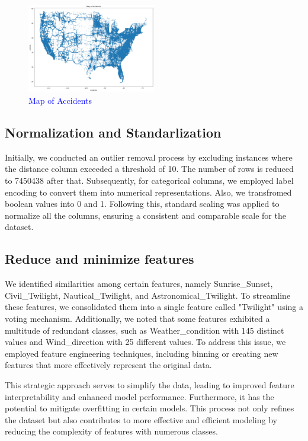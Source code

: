 \documentclass[10pt,twocolumn,letterpaper]{article}
\begin{document}
\begin{CJK}{UTF8}{bsmi}
\begin{figure}[h]
    \centering
    \includegraphics[width=0.5\textwidth]{graph3.png}
    \caption{\textcolor{blue}{Map of Accidents}}
    \label{Fig.3}
\end{figure}

\subsection{Normalization and Standarlization}
Initially, we conducted an outlier removal process by excluding instances where the distance column exceeded a threshold of 10. The number of rows is reduced to 7450438 after that. Subsequently, for categorical columns, we employed label encoding to convert them into numerical representations. Also, we transfromed boolean values into 0 and 1. Following this, standard scaling was applied to normalize all the columns, ensuring a consistent and comparable scale for the dataset.

\subsection{Reduce and minimize features}
We identified similarities among certain features, namely Sunrise\_Sunset, Civil\_Twilight, Nautical\_Twilight, and Astronomical\_Twilight. To streamline these features, we consolidated them into a single feature called "Twilight" using a voting mechanism. Additionally, we noted that some features exhibited a multitude of redundant classes, such as Weather\_condition with 145 distinct values and Wind\_direction with 25 different values. To address this issue, we employed feature engineering techniques, including binning or creating new features that more effectively represent the original data.

This strategic approach serves to simplify the data, leading to improved feature interpretability and enhanced model performance. Furthermore, it has the potential to mitigate overfitting in certain models. This process not only refines the dataset but also contributes to more effective and efficient modeling by reducing the complexity of features with numerous classes.

\end{CJK}
\end{document}
